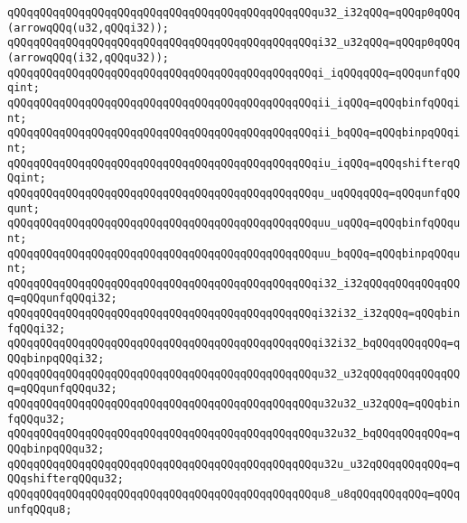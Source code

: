 \newline
\verb|qQQqqQQqqQQqqQQqqQQqqQQqqQQqqQQqqQQqqQQqqQQqqQQqu32_i32qQQq=qQQqp0qQQq(arrowqQQq(u32,qQQqi32));|\newline
\verb|qQQqqQQqqQQqqQQqqQQqqQQqqQQqqQQqqQQqqQQqqQQqqQQqi32_u32qQQq=qQQqp0qQQq(arrowqQQq(i32,qQQqu32));|\newline
\newline
\verb|qQQqqQQqqQQqqQQqqQQqqQQqqQQqqQQqqQQqqQQqqQQqqQQqi_iqQQqqQQq=qQQqunfqQQqint;|\newline
\verb|qQQqqQQqqQQqqQQqqQQqqQQqqQQqqQQqqQQqqQQqqQQqqQQqii_iqQQq=qQQqbinfqQQqint;|\newline
\verb|qQQqqQQqqQQqqQQqqQQqqQQqqQQqqQQqqQQqqQQqqQQqqQQqii_bqQQq=qQQqbinpqQQqint;|\newline
\verb|qQQqqQQqqQQqqQQqqQQqqQQqqQQqqQQqqQQqqQQqqQQqqQQqiu_iqQQq=qQQqshifterqQQqint;|\newline
\newline
\verb|qQQqqQQqqQQqqQQqqQQqqQQqqQQqqQQqqQQqqQQqqQQqqQQqu_uqQQqqQQq=qQQqunfqQQqunt;|\newline
\verb|qQQqqQQqqQQqqQQqqQQqqQQqqQQqqQQqqQQqqQQqqQQqqQQquu_uqQQq=qQQqbinfqQQqunt;|\newline
\verb|qQQqqQQqqQQqqQQqqQQqqQQqqQQqqQQqqQQqqQQqqQQqqQQquu_bqQQq=qQQqbinpqQQqunt;|\newline
\newline
\verb|qQQqqQQqqQQqqQQqqQQqqQQqqQQqqQQqqQQqqQQqqQQqqQQqi32_i32qQQqqQQqqQQqqQQq=qQQqunfqQQqi32;|\newline
\verb|qQQqqQQqqQQqqQQqqQQqqQQqqQQqqQQqqQQqqQQqqQQqqQQqi32i32_i32qQQq=qQQqbinfqQQqi32;|\newline
\verb|qQQqqQQqqQQqqQQqqQQqqQQqqQQqqQQqqQQqqQQqqQQqqQQqi32i32_bqQQqqQQqqQQq=qQQqbinpqQQqi32;|\newline
\newline
\verb|qQQqqQQqqQQqqQQqqQQqqQQqqQQqqQQqqQQqqQQqqQQqqQQqu32_u32qQQqqQQqqQQqqQQq=qQQqunfqQQqu32;|\newline
\verb|qQQqqQQqqQQqqQQqqQQqqQQqqQQqqQQqqQQqqQQqqQQqqQQqu32u32_u32qQQq=qQQqbinfqQQqu32;|\newline
\verb|qQQqqQQqqQQqqQQqqQQqqQQqqQQqqQQqqQQqqQQqqQQqqQQqu32u32_bqQQqqQQqqQQq=qQQqbinpqQQqu32;|\newline
\verb|qQQqqQQqqQQqqQQqqQQqqQQqqQQqqQQqqQQqqQQqqQQqqQQqu32u_u32qQQqqQQqqQQq=qQQqshifterqQQqu32;|\newline
\newline
\verb|qQQqqQQqqQQqqQQqqQQqqQQqqQQqqQQqqQQqqQQqqQQqqQQqu8_u8qQQqqQQqqQQq=qQQqunfqQQqu8;|\newline
